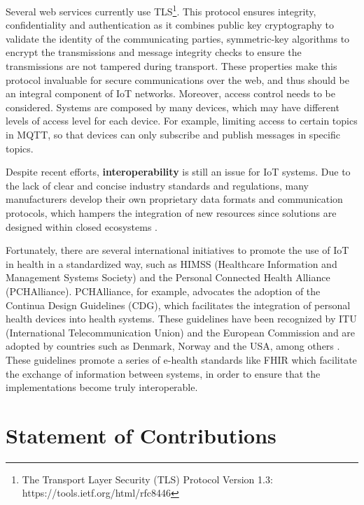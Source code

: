Several web services currently use \acf{TLS}\footnote{The Transport Layer Security (TLS) Protocol Version 1.3: https://tools.ietf.org/html/rfc8446}. This protocol ensures integrity, confidentiality and authentication as it combines public key cryptography to validate the identity of the communicating parties, symmetric-key algorithms to encrypt the transmissions and message integrity checks to ensure the transmissions are not tampered during transport. These properties make this protocol invaluable for secure communications over the web, and thus should be an integral component of \acs{IoT} networks. Moreover, access control needs to be considered. Systems are composed by many devices, which may have different levels of access level for each device. For example, limiting access to certain topics in \acs{MQTT}, so that devices can only subscribe and publish messages in specific topics.        
 
Despite recent efforts, \textbf{interoperability} is still an issue for \acs{IoT} systems. Due to the lack of clear and concise industry standards and regulations, many manufacturers develop their own proprietary data formats and communication protocols, which hampers the integration of new resources since solutions are designed within closed ecosystems \cite{Rubi2019}. \bigskip

Fortunately, there are several international initiatives to promote the use of \acs{IoT} in health in a standardized way, such as HIMSS (Healthcare Information and Management Systems Society) and the Personal Connected Health Alliance (PCHAlliance). PCHAlliance, for example, advocates the adoption of the Continua Design Guidelines (CDG), which facilitates the integration of personal health devices into health systems. These guidelines have been recognized by ITU (International Telecommunication Union) and the European Commission and are adopted by countries such as Denmark, Norway and the USA, among others \cite{PersonalConnectedHealthAlliance2017}. These guidelines promote a series of e-health standards like \acs{FHIR} which facilitate the exchange of information between systems, in order to ensure that the implementations become truly interoperable.

\section{Statement of Contributions}

